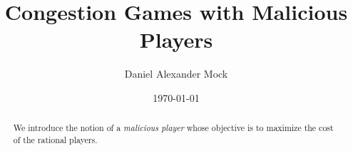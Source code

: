 \documentclass[a4paper]{tufte-handout}
\title{Congestion Games with Malicious Players}
\author{Daniel Alexander Mock}
\date{\today}
\begin{document}
\maketitle

\begin{abstract}
	We introduce the notion of a \emph{malicious player} whose objective is to maximize the cost of the rational players.
\end{abstract}


\newpage


\newpage


\newpage


\newpage


\newpage
\end{document}
